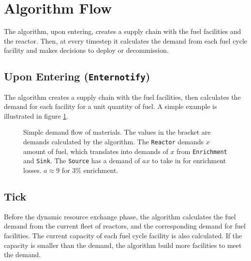 \documentclass[12pt,letterpaper]{article}
\begin{document}
\section{Algorithm Flow}

The algorithm, upon entering, creates a supply chain with the fuel facilities and
the reactor. Then, at every timestep it calculates the demand from each fuel cycle
facility and makes decisions to deploy or decommission.

\subsection{Upon Entering (\texttt{Enternotify})}

The algorithm creates a supply chain with the fuel facilities,
then calculates the demand for each facility for a unit quantity of fuel.
A simple example is illustrated in figure \ref{diag:dem}.

\begin{figure}[H]
\caption{Simple demand flow of materials. The values in the bracket are demands calculated
         by the algorithm. The \texttt{Reactor} demands $x$ amount of fuel,
         which translates into demands of $x$ from \texttt{Enrichment} and \texttt{Sink}.
         The \texttt{Source} has a demand of $a x$ to take in for enrichment losses.
         $a \approx 9 $ for 3\% enrichment.}
\label{diag:dem}
\end{figure}

\subsection{Tick}
Before the dynamic resource exchange phase, the algorithm calculates the fuel demand
from the current fleet of reactors, and the corresponding demand for fuel facilities.
The current capacity of each fuel cycle facility is also calculated. If the capacity
is smaller than the demand, the algorithm build more facilities to meet the demand.
\end{document}
